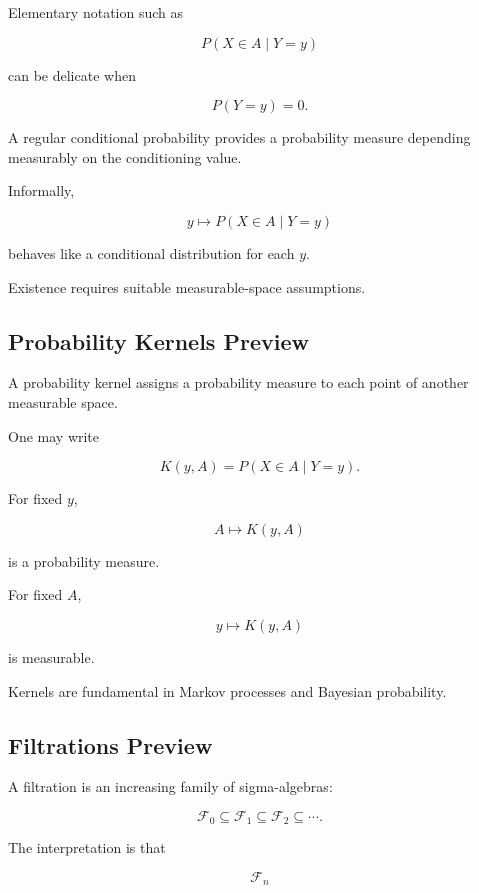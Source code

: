 Elementary notation such as

\[
P(X\in A\mid Y=y)
\]

can be delicate when

\[
P(Y=y)=0.
\]

A regular conditional probability provides a probability measure
depending measurably on the conditioning value.

Informally,

\[
\boxed{
y
\mapsto
P(X\in A\mid Y=y)
}
\]

behaves like a conditional distribution for each \(y\).

Existence requires suitable measurable-space assumptions.

\subsection{Probability Kernels Preview}
\label{subsec:probability-kernels-preview}

A probability kernel assigns a probability measure to each point of
another measurable space.

One may write

\[
\boxed{
K(y,A)
=
P(X\in A\mid Y=y).
}
\]

For fixed \(y\),

\[
A\mapsto K(y,A)
\]

is a probability measure.

For fixed \(A\),

\[
y\mapsto K(y,A)
\]

is measurable.

Kernels are fundamental in Markov processes and Bayesian probability.

\subsection{Filtrations Preview}
\label{subsec:filtrations-preview}

A filtration is an increasing family of sigma-algebras:

\[
\boxed{
\mathcal{F}_0
\subseteq
\mathcal{F}_1
\subseteq
\mathcal{F}_2
\subseteq
\cdots.
}
\]

The interpretation is that

\[
\mathcal{F}_n
\]

